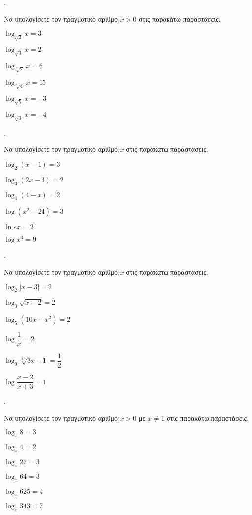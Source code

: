 \documentclass[11pt,a4paper,twocolumn]{article}
\newcounter{askhsh}
\newcommand{\askhsh}{\large\theaskhsh.\ \addtocounter{askhsh}{1}}
\begin{document}
\askhsh Να υπολογίσετε τον πραγματικό αριθμό $ x>0 $ στις παρακάτω παραστάσεις.
\begin{multicols}{2}
\begin{alist}
\item $ \log_{\sqrt{2}}{x}=3 $
\item $ \log_{\sqrt{3}}{x}=2 $
\item $ \log_{\sqrt[3]{2}}{x}=6 $
\item $ \log_{\sqrt[5]{4}}{x}=15 $
\item $ \log_{\sqrt{5}}{x}=-3 $
\item $ \log_{\sqrt{3}}{x}=-4 $
\end{alist}
\end{multicols}
\askhsh Να υπολογίσετε τον πραγματικό αριθμό $ x $ στις παρακάτω παραστάσεις.
\begin{multicols}{2}
\begin{alist}
\item $ \log_{2}{(x-1)}=3 $
\item $ \log_{3}{(2x-3)}=2 $
\item $ \log_{4}{(4-x)}=2 $
\item $ \log{\left( x^2-24\right) }=3 $
\item $ \ln{ex}=2 $
\item $ \log{x^3}=9 $
\end{alist}
\end{multicols}
\askhsh Να υπολογίσετε τον πραγματικό αριθμό $ x $ στις παρακάτω παραστάσεις.
\begin{multicols}{2}
\begin{alist}[leftmargin=4mm]
\item $ \log_{2}{|x-3|}=2 $
\item $ \log_{3}{\sqrt{x-2}}=2 $
\item $ \log_{5}{\left(10x-x^2\right) }=2 $
\item $ \log{\dfrac{1}{x}}=2 $
\item $ \log_{9}{\sqrt[3]{3x-1}}=\dfrac{1}{2} $
\item $ \log{\dfrac{x-2}{x+3}}=1 $
\end{alist}
\end{multicols}
\askhsh Να υπολογίσετε τον πραγματικό αριθμό $ x>0$ με $ x\neq 1 $ στις παρακάτω παραστάσεις.
\begin{multicols}{2}
\begin{alist}
\item $ \log_{x}{8}=3 $
\item $ \log_{x}{4}=2 $
\item $ \log_{x}{27}=3 $
\item $ \log_{x}{64}=3 $
\item $ \log_{x}{625}=4 $
\item $ \log_{x}{343}=3 $
\end{alist}
\end{multicols}
\end{document}
